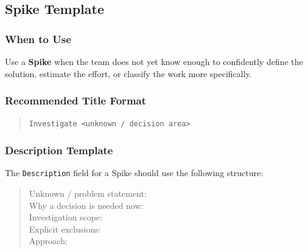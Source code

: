 \documentclass[11pt,a4paper]{article}
\begin{document}
\subsection{Spike Template}

\subsubsection*{When to Use}
Use a \textbf{Spike} when the team does not yet know enough to confidently define the solution, estimate the effort, or classify the work more specifically.

\subsubsection*{Recommended Title Format}
\begin{quote}
\texttt{Investigate <unknown / decision area>}
\end{quote}

\subsubsection*{Description Template}
The \texttt{Description} field for a Spike should use the following structure:
\begin{quote}
Unknown / problem statement: \\
Why a decision is needed now: \\
Investigation scope: \\
Explicit exclusions: \\
Approach:
\end{quote}
\end{document}
